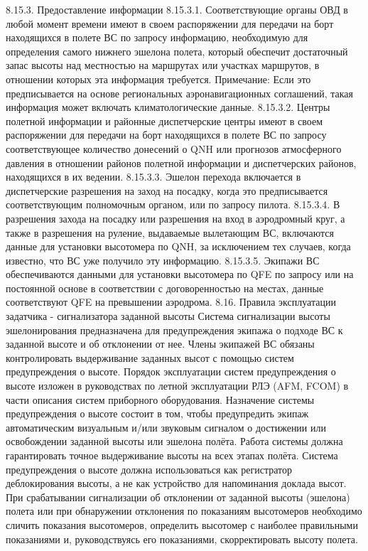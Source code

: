 8.15.3.	Предоставление информации
8.15.3.1. Соответствующие органы ОВД в любой момент времени имеют в своем распоряжении для передачи на борт находящихся в полете ВС по запросу информацию, необходимую для определения самого нижнего эшелона полета, который обеспечит достаточный запас высоты над местностью на маршрутах или участках маршрутов, в отношении которых эта информация требуется.
Примечание: Если это предписывается на основе региональных аэронавигационных соглашений, такая информация может включать климатологические данные.
8.15.3.2. Центры полетной информации и районные диспетчерские центры имеют в своем распоряжении для передачи на борт находящихся в полете ВС по запросу соответствующее количество донесений о QNH или прогнозов атмосферного давления в отношении районов полетной информации и диспетчерских районов, находящихся в их ведении.
8.15.3.3. Эшелон перехода включается в диспетчерские разрешения на заход на посадку, когда это предписывается соответствующим полномочным органом, или по запросу пилота.
8.15.3.4. В разрешения захода на посадку или разрешения на вход в аэродромный круг, а также в разрешения на руление, выдаваемые вылетающим ВС, включаются данные для установки высотомера по QNH, за исключением тех случаев, когда известно, что ВС уже получило эту информацию.
8.15.3.5. Экипажи ВС обеспечиваются данными для установки высотомера по QFE по запросу или на постоянной основе в соответствии с договоренностью на местах, данные соответствуют QFE на превышении аэродрома.
8.16.	Правила эксплуатации задатчика - сигнализатора заданной высоты
Система сигнализации высоты эшелонирования предназначена для предупреждения экипажа о подходе ВС к заданной высоте и об отклонении от нее. 
Члены экипажей ВС обязаны контролировать выдерживание заданных высот с помощью систем предупреждения о высоте. Порядок эксплуатации систем предупреждения о высоте изложен в руководствах по летной эксплуатации РЛЭ (AFM, FCOM) в части описания систем приборного оборудования.
Назначение системы предупреждения о высоте состоит в том, чтобы предупредить экипаж автоматическим визуальным и/или звуковым сигналом о достижении или освобождении заданной высоты или эшелона полёта. Работа системы должна гарантировать точное выдерживание высоты на всех этапах полёта. Система предупреждения о высоте должна использоваться как регистратор деблокирования высоты, а не как устройство для напоминания доклада высот.
При срабатывании сигнализации об отклонении от заданной высоты (эшелона) полета или при обнаружении отклонения по показаниям высотомеров необходимо сличить показания высотомеров, определить высотомер с наиболее правильными показаниями и, руководствуясь его показаниями, скорректировать высоту полета.
